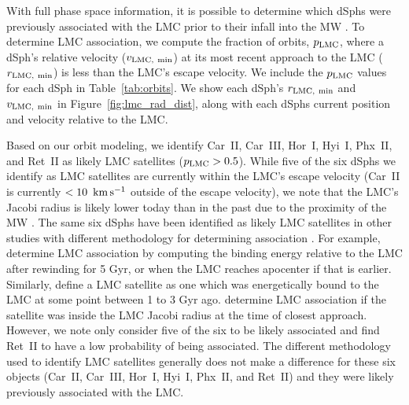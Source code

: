 \documentclass[twocolumn]{aastex63}
\begin{document}
With full phase space information, it is possible to determine which dSphs were previously associated with the LMC prior to their infall into the MW 
\citep{Deason2015MNRAS.453.3568D, Jethwa2016MNRAS.461.2212J, Sales2017MNRAS.465.1879S, Kallivayalil2018ApJ...867...19K, Fritz2019A&A...623A.129F, Patel2020ApJ...893..121P, Battaglia2022A&A...657A..54B, Erkal2020MNRAS.495.2554E, SantosSantos2021MNRAS.504.4551S, CorreaMagnus2022MNRAS.511.2610C}. 
To determine LMC association, we compute the fraction of orbits, $p_{\rm LMC}$, where a dSph's relative velocity ($v_{\rm LMC,~min}$) at its most recent approach to the LMC ($r_{\rm LMC,~min}$) is less than the LMC's escape velocity. 
We include the $p_{\rm LMC}$ values for each dSph in Table~\ref{tab:orbits}. We show each dSph's  $r_{\rm LMC,~min}$ and $v_{\rm LMC,~min}$ in Figure~\ref{fig:lmc_rad_dist}, along with each dSphs current position and velocity relative to the LMC.  

Based on our orbit modeling, we identify Car~II, Car~III,  Hor~I, Hyi~I, Phx~II, and Ret~II as   likely  LMC satellites ($p_{\rm LMC}>0.5$).
While five of the six dSphs we identify as LMC satellites are currently within the LMC's escape velocity (Car~II is currently $<10~\mathrm{\,km} \mathrm{\,s}^{-1}$ outside of the escape velocity), we note that the LMC's Jacobi radius is likely lower today than in the past due to the proximity of the MW \citep{Battaglia2022A&A...657A..54B}.  
The same six dSphs have been identified as likely  LMC satellites in other studies with different methodology for determining association \citep{Kallivayalil2018ApJ...867...19K,Erkal2020MNRAS.495.2554E, Patel2020ApJ...893..121P, Battaglia2022A&A...657A..54B}. 
For example, \citet{Erkal2020MNRAS.495.2554E} determine LMC association by computing the binding energy relative to the LMC after rewinding for 5 Gyr, or when the LMC reaches apocenter if that is earlier. 
Similarly, \citet{CorreaMagnus2022MNRAS.511.2610C} define a LMC satellite as one which was energetically bound to the LMC at some point between 1 to 3 Gyr ago. 
\citet{Battaglia2022A&A...657A..54B} determine LMC association if the satellite was inside the LMC Jacobi radius at the time of closest approach. 
However, we note \citet{CorreaMagnus2022MNRAS.511.2610C} only consider  five of the six to be likely associated and find  Ret~II to have a low probability of being associated. 
The different methodology used to identify LMC satellites generally does not make a difference for these six objects (Car~II, Car~III, Hor~I, Hyi~I, Phx~II, and Ret~II) and they were likely previously associated with the LMC. 
\end{document}
